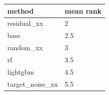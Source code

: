 \begin{tabular}{ll}
\toprule
method & mean rank \\
\midrule
residual\_xx & 2 \\
base & 2.5 \\
random\_xx & 3 \\
rf & 3.5 \\
lightgbm & 4.5 \\
target\_noise\_xx & 5.5 \\
\bottomrule
\end{tabular}
